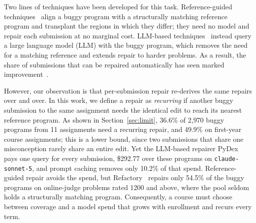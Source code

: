 \documentclass[acmsmall,screen,review,anonymous,nonacm]{acmart}
\newcommand{\cs}{\texttt{claude-sonnet-5}\xspace}
\begin{document}
Two lines of techniques have been developed for this task. Reference-guided techniques~\cite{gulwani2018automated,wang2018search,hu2019re,ahmed2022verifix} align a buggy program with a structurally matching reference program and transplant the regions in which they differ; they need no model and repair each submission at no marginal cost. LLM-based techniques~\cite{zhang2024pydex,xia2024automated,yang2024cref,liu2024fastfixer,orvalho2025counterexample,orvalho2025mentor,yang2026morepair,dai2026learner} instead query a large language model (LLM) with the buggy program, which removes the need for a matching reference and extends repair to harder problems. As a result, the share of submissions that can be repaired automatically has seen marked improvement~\cite{zhang2024pydex,orvalho2025mentor}.

However, our observation is that per-submission repair re-derives the same repairs over and over. In this work, we define a repair as \emph{recurring} if another buggy submission to the same assignment needs the identical edit to reach its nearest reference program. As shown in Section~\ref{sec:limit}, 36.6\% of 2{,}970 buggy programs from 11 assignments need a recurring repair, and 49.9\% on first-year course assignments; this is a lower bound, since two submissions that share one misconception rarely share an entire edit. Yet the LLM-based repairer PyDex~\cite{zhang2024pydex} pays one query for every submission, \$292.77 over these programs on \cs, and prompt caching removes only 10.2\% of that spend. Reference-guided repair avoids the spend, but Refactory~\cite{hu2019re} repairs only 54.5\% of the buggy programs on online-judge problems rated 1200 and above, where the pool seldom holds a structurally matching program. Consequently, a course must choose between coverage and a model spend that grows with enrollment and recurs every term.
\end{document}
